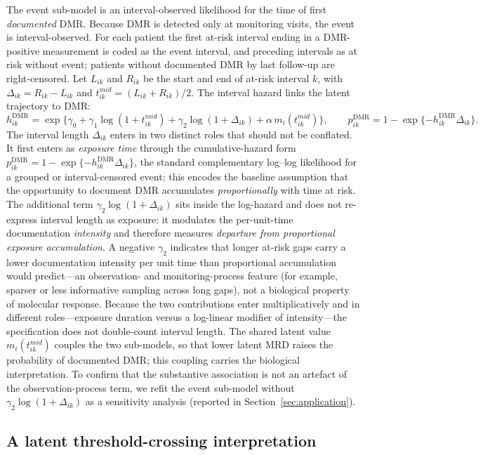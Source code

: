 \documentclass[11pt]{article}
\begin{document}
The event sub-model is an interval-observed likelihood for the time of first
\emph{documented} DMR. Because DMR is detected only at monitoring visits, the
event is interval-observed. For each patient the first at-risk interval ending in a
DMR-positive measurement is coded as the event interval, and preceding
intervals as at risk without event; patients without documented DMR by
last follow-up are right-censored. Let $L_{ik}$ and $R_{ik}$ be the start
and end of at-risk interval $k$, with $\Delta_{ik}=R_{ik}-L_{ik}$ and
$t_{ik}^{mid}=(L_{ik}+R_{ik})/2$. The interval hazard links the latent
trajectory to DMR:
\[
h_{ik}^{\mathrm{DMR}}=
\exp\{\gamma_0+\gamma_1\log(1+t_{ik}^{mid})
+\gamma_2\log(1+\Delta_{ik})
+\alpha\, m_i(t_{ik}^{mid})\},
\qquad
p_{ik}^{\mathrm{DMR}}=
1-\exp\{-h_{ik}^{\mathrm{DMR}}\Delta_{ik}\}.
\]
The interval length $\Delta_{ik}$ enters in two distinct roles that should
not be conflated. It first enters as \emph{exposure time} through the
cumulative-hazard form
$p_{ik}^{\mathrm{DMR}}=1-\exp\{-h_{ik}^{\mathrm{DMR}}\Delta_{ik}\}$, the
standard complementary log--log likelihood for a grouped or interval-censored
event; this encodes the baseline assumption that the opportunity to document
DMR accumulates \emph{proportionally} with time at risk. The additional term
$\gamma_2\log(1+\Delta_{ik})$ sits inside the log-hazard and does not
re-express interval length as exposure: it modulates the per-unit-time
documentation \emph{intensity} and therefore measures \emph{departure from
proportional exposure accumulation}. A negative $\gamma_2$ indicates that
longer at-risk gaps carry a lower documentation intensity per unit time than
proportional accumulation would predict---an observation- and
monitoring-process feature (for example, sparser or less informative sampling
across long gaps), not a biological property of molecular response. Because
the two contributions enter multiplicatively and in different roles---exposure
duration versus a log-linear modifier of intensity---the specification does
not double-count interval length. The shared latent value
$m_i(t_{ik}^{mid})$ couples the two sub-models, so that lower latent MRD raises
the probability of documented DMR; this coupling carries the biological
interpretation. To confirm that the substantive association is not an artefact
of the observation-process term, we refit the event sub-model without
$\gamma_2\log(1+\Delta_{ik})$ as a sensitivity analysis (reported in
Section~\ref{sec:application}).

\subsection{A latent threshold-crossing interpretation}
\label{sec:threshold}
\end{document}
